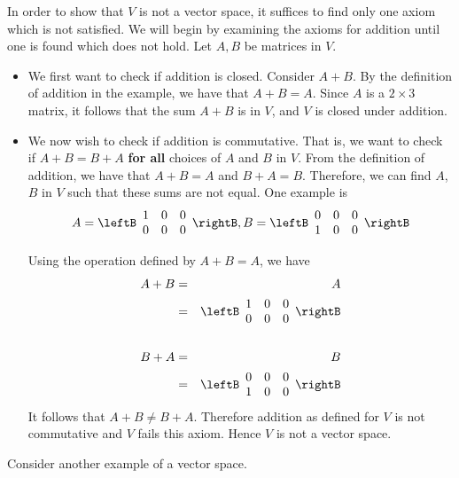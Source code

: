 \begin{solution}
In order to show that $V$ is not a vector space, it suffices to find only one axiom which is not satisfied. We will begin by examining the axioms for addition until one is found which does not hold. Let $A,B$ be matrices in $V$. 

\begin{itemize}
\item
We first want to check if addition is closed. Consider $A+B$. By the definition of addition in the example, we have that $A+B = A$. Since $A$ is a $2 \times 3$ matrix, it follows that the sum $A+B$ is in $V$, and $V$ is closed under addition. 

\item
We now wish to check if addition is commutative. That is, we want to check if $A + B = B + A$ \textbf{for all} choices of $A$ and $B$ in $V$. From the definition of addition, we have that $A + B = A$ and $B + A = B$. Therefore, we can find $A$, $B$ in $V$ such that these sums are not equal. One example is 
\[
A = \leftB \begin{array}{rrr}
1 & 0 & 0 \\
0 & 0 & 0 
\end{array}\rightB, B = \leftB \begin{array}{rrr}
0 & 0 & 0 \\
1 & 0 & 0 
\end{array}\rightB
\]

Using the operation defined by $A+B=A$, we have 
\begin{eqnarray*}
A+B &=& A \\
&=& \leftB \begin{array}{rrr}
1 & 0 & 0 \\
0 & 0 & 0 
\end{array}\rightB \\
\\
B+A &=& B \\
&=& \leftB \begin{array}{rrr}
0 & 0 & 0 \\
1 & 0 & 0 
\end{array}\rightB
\end{eqnarray*}
It follows that $A+B \neq B+A$. Therefore addition as defined for $V$ is not commutative and $V$ fails this axiom. Hence $V$ is not a vector space.
\end{itemize}
\end{solution}

Consider another example of a vector space. 

